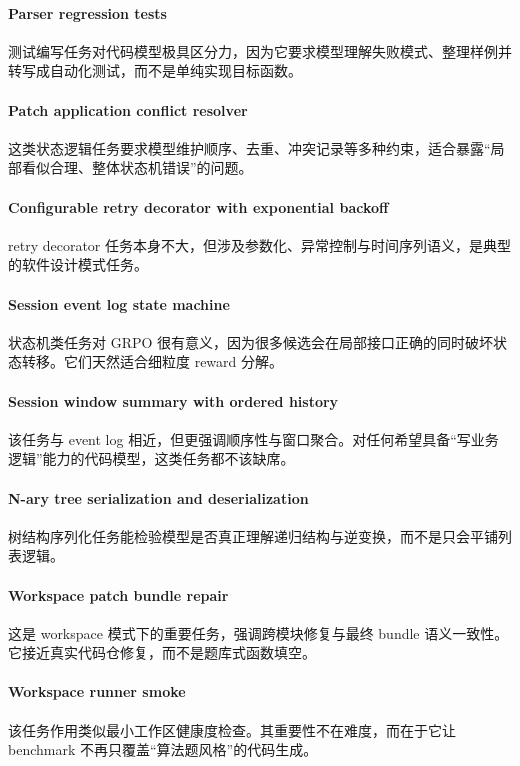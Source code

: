 \documentclass[11pt,a4paper]{article}
\begin{document}
\paragraph{Parser regression tests}
测试编写任务对代码模型极具区分力，因为它要求模型理解失败模式、整理样例并转写成自动化测试，而不是单纯实现目标函数。

\paragraph{Patch application conflict resolver}
这类状态逻辑任务要求模型维护顺序、去重、冲突记录等多种约束，适合暴露“局部看似合理、整体状态机错误”的问题。

\paragraph{Configurable retry decorator with exponential backoff}
retry decorator 任务本身不大，但涉及参数化、异常控制与时间序列语义，是典型的软件设计模式任务。

\paragraph{Session event log state machine}
状态机类任务对 GRPO 很有意义，因为很多候选会在局部接口正确的同时破坏状态转移。它们天然适合细粒度 reward 分解。

\paragraph{Session window summary with ordered history}
该任务与 event log 相近，但更强调顺序性与窗口聚合。对任何希望具备“写业务逻辑”能力的代码模型，这类任务都不该缺席。

\paragraph{N-ary tree serialization and deserialization}
树结构序列化任务能检验模型是否真正理解递归结构与逆变换，而不是只会平铺列表逻辑。

\paragraph{Workspace patch bundle repair}
这是 workspace 模式下的重要任务，强调跨模块修复与最终 bundle 语义一致性。它接近真实代码仓修复，而不是题库式函数填空。

\paragraph{Workspace runner smoke}
该任务作用类似最小工作区健康度检查。其重要性不在难度，而在于它让 benchmark 不再只覆盖“算法题风格”的代码生成。
\end{document}
